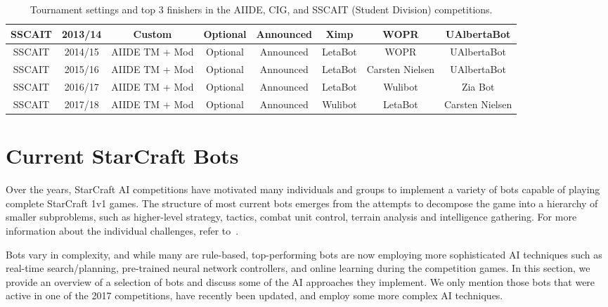 \begin{table}[t]
\begin{center}
\begin{tabular} {| c | c | c c c | c c c |}
 \hline
 SSCAIT & 2013/14 & Custom & Optional & Announced & Ximp & WOPR & UAlbertaBot \\
 \hline
 SSCAIT & 2014/15 & AIIDE TM + Mod & Optional & Announced & LetaBot & WOPR & UAlbertaBot\\
 \hline
 SSCAIT & 2015/16 & AIIDE TM + Mod & Optional & Announced & LetaBot & Carsten Nielsen & UAlbertaBot \\
 \hline
 SSCAIT & 2016/17 & AIIDE TM + Mod & Optional & Announced & LetaBot & Wulibot & Zia Bot\\
 \hline
 SSCAIT & 2017/18 & AIIDE TM + Mod & Optional & Announced & Wulibot & LetaBot & Carsten Nielsen\\
 \hline
 \end{tabular}
 \end{center}  
 \caption{Tournament settings and top 3 finishers in the AIIDE, CIG, and SSCAIT (Student Division) competitions.}
 \label{tableTournaments}
\end{table} 

\section{Current StarCraft Bots}\label{secBots}

Over the years, StarCraft AI competitions have motivated many individuals and groups to implement a variety of bots capable of playing complete StarCraft 1v1 games. The structure of most current bots emerges from the attempts to decompose the game into a hierarchy of smaller subproblems, such as higher-level strategy, tactics, combat unit control, terrain analysis and intelligence gathering. For more information about the individual challenges, refer to~\cite{Survey2013,churchill2016starcraft}. 

Bots vary in complexity, and while many are rule-based, top-performing bots are now employing more sophisticated AI techniques such as real-time search/planning, pre-trained neural network controllers, and online learning during the competition games.
In this section, we provide an overview of a selection of bots and discuss some of the AI approaches they implement. We only mention those bots that were active in one of the 2017 competitions, have recently been updated, and employ some more complex AI techniques. 

